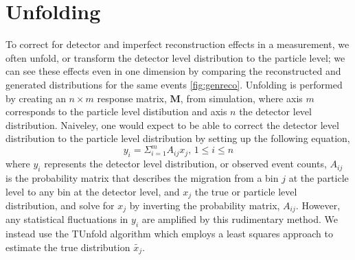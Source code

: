 \chapter{Unfolding}\label{chap:conclusion}
  To correct for detector and imperfect reconstruction effects in a measurement, we often unfold, or transform the detector level distribution to the particle level; we can see these effects even in one dimension by comparing the reconstructed and generated distributions for the same events \ref{fig:genreco}. Unfolding is performed by creating an $n\times m$ response matrix, $\mathbf{M}$, from simulation, where axis $m$ corresponds to the particle level distibution and axis $n$ the detector level distribution. Naiveley, one would expect to be able to correct the detector level distribution to the particle level distribution by setting up the following equation,
  \begin{equation}
    \label{eq:unfold1}
    y_i = \Sigma_{i=1}^{m}A_{ij}x_j, \, 1 \leq i \leq n
  \end{equation}
  where $y_i$ represents the detector level distribution, or observed event counts, $A_{ij}$ is the probability matrix that describes the migration from a bin $j$ at the particle level to any bin at the detector level, and $x_j$ the true or particle level distribution, and solve for $x_j$ by inverting the probability matrix, $A_{ij}$. However, any statistical fluctuations in $y_i$ are amplified by this rudimentary method. We instead use the TUnfold algorithm \cite{tunfold} which employs a least squares approach to estimate the true distribution $\tilde{x_j}$.
